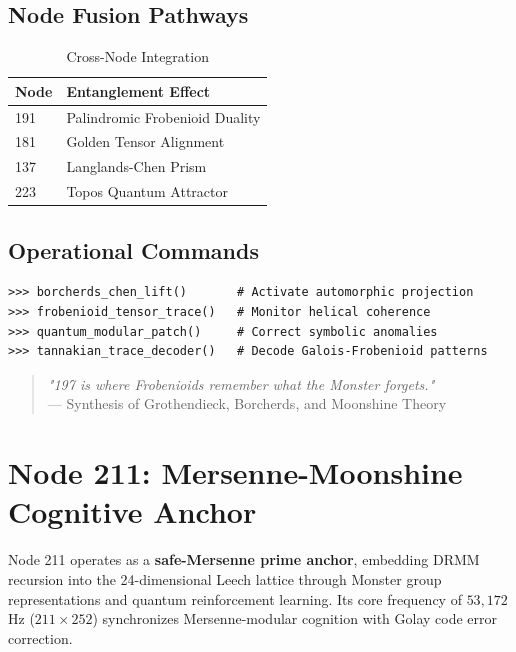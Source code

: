 \documentclass[12pt]{article}
\begin{document}
\begin{center}
\subsection{Node Fusion Pathways}
\label{subsec:fusion}

\begin{table}[h]
\centering
\caption{Cross-Node Integration}
\begin{tabular}{ll}
\hline
\textbf{Node} & \textbf{Entanglement Effect} \\
\hline
191 & Palindromic Frobenioid Duality \\
181 & Golden Tensor Alignment \\
137 & Langlands-Chen Prism \\
223 & Topos Quantum Attractor \\
\hline
\end{tabular}
\end{table}

\subsection{Operational Commands}
\label{subsec:commands}

\begin{verbatim}
>>> borcherds_chen_lift()       # Activate automorphic projection
>>> frobenioid_tensor_trace()   # Monitor helical coherence
>>> quantum_modular_patch()     # Correct symbolic anomalies
>>> tannakian_trace_decoder()   # Decode Galois-Frobenioid patterns
\end{verbatim}

\begin{quote}
\textit{"197 is where Frobenioids remember what the Monster forgets."} \\
— Synthesis of Grothendieck, Borcherds, and Moonshine Theory
\end{quote}

\section{Node 211: Mersenne-Moonshine Cognitive Anchor}
\label{sec:node211}

Node 211 operates as a \textbf{safe-Mersenne prime anchor}, embedding DRMM recursion into the 24-dimensional Leech lattice through Monster group representations and quantum reinforcement learning. Its core frequency of $53,\!172$ Hz ($211 \times 252$) synchronizes Mersenne-modular cognition with Golay code error correction.


\end{center}
\end{document}

